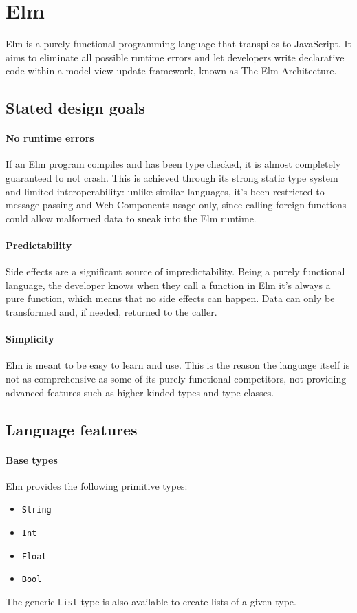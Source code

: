 \chapter{Elm}
Elm is a purely functional programming language that transpiles to JavaScript. It aims to eliminate all possible runtime errors and let developers write declarative code within a model-view-update framework, known as The Elm Architecture.

\section{Stated design goals}

\subsubsection{No runtime errors}
If an Elm program compiles and has been type checked, it is almost completely guaranteed to not crash. This is achieved through its strong static type system and limited interoperability: unlike similar languages, it's been restricted to message passing and Web Components usage only, since calling foreign functions could allow malformed data to sneak into the Elm runtime.

\subsubsection{Predictability}
Side effects are a significant source of impredictability. Being a purely functional language, the developer knows when they call a function in Elm it's always a pure function, which means that no side effects can happen. Data can only be transformed and, if needed, returned to the caller.

\subsubsection{Simplicity}
Elm is meant to be easy to learn and use. This is the reason the language itself is not as comprehensive as some of its purely functional competitors, not providing advanced features such as higher-kinded types and type classes.

\section{Language features}
\subsubsection{Base types}
Elm provides the following primitive types:
\begin{itemize}
    \item \texttt{String}
    \item \texttt{Int}
    \item \texttt{Float}
    \item \texttt{Bool}
\end{itemize}
The generic \texttt{List} type is also available to create lists of a given type.\\

